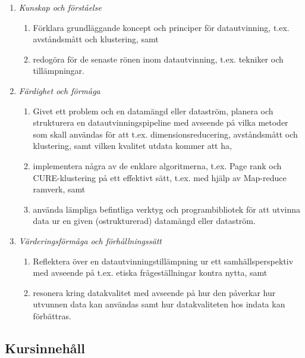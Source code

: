 \begin{enumerate}
\def\labelenumi{\Alph{enumi}.}
\tightlist
\item
  \emph{Kunskap och förståelse}

  \begin{enumerate}
  \def\labelenumii{\Alph{enumi}.\arabic{enumii}.}
  \tightlist
  \item
    Förklara grundläggande koncept och principer för datautvinning,
    t.ex. avståndsmått och klustering, samt
  \item
    redogöra för de senaste rönen inom datautvinning, t.ex. tekniker och
    tillämpningar.
  \end{enumerate}
\item
  \emph{Färdighet och förmåga}

  \begin{enumerate}
  \def\labelenumii{\Alph{enumi}.\arabic{enumii}.}
  \tightlist
  \item
    Givet ett problem och en datamängd eller dataström, planera och
    strukturera en datautvinningspipeline med avseende på vilka metoder
    som skall användas för att t.ex. dimensionsreducering, avståndsmått
    och klustering, samt vilken kvalitet utdata kommer att ha,
  \item
    implementera några av de enklare algoritmerna, t.ex. Page rank och
    CURE-klustering på ett effektivt sätt, t.ex. med hjälp av Map-reduce
    ramverk, samt
  \item
    använda lämpliga befintliga verktyg och programbibliotek för att
    utvinna data ur en given (ostrukturerad) datamängd eller dataström.
  \end{enumerate}
\item
  \emph{Värderingsförmåga och förhållningssätt}

  \begin{enumerate}
  \def\labelenumii{\Alph{enumi}.\arabic{enumii}.}
  \tightlist
  \item
    Reflektera över en datautvinningstillämpning ur ett
    samhällsperspektiv med avseende på t.ex. etiska frågeställningar
    kontra nytta, samt
  \item
    resonera kring datakvalitet med avseende på hur den påverkar hur
    utvunnen data kan användas samt hur datakvaliteten hos indata kan
    förbättras.
  \end{enumerate}
\end{enumerate}

\subsection*{Kursinnehåll}

